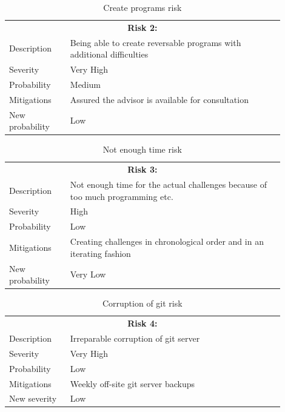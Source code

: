\begin{table}
  \centering
  \begin{tabular}{|p{0.2\linewidth}p{0.7\linewidth}|}
    \hline
    \multicolumn{2}{|c|}{\textbf{Risk 2:}} \\
    Description     & Being able to create reversable programs with additional difficulties           \\
    Severity        & Very High                                 \\
    Probability     & Medium                                   \\
    Mitigations     & Assured the advisor is available for consultation  \\
    New probability & Low       \\
    \hline                            
  \end{tabular}
  \caption{Create programs risk}
\end{table}

\begin{table}
  \centering
  \begin{tabular}{|p{0.2\linewidth}p{0.7\linewidth}|}
    \hline
    \multicolumn{2}{|c|}{\textbf{Risk 3:}} \\
    Description            & Not enough time for the actual challenges because of too much programming etc.           \\
    Severity        & High                                 \\
    Probability     & Low                                   \\
    Mitigations     & Creating challenges in chronological order and in an iterating fashion  \\
    New probability & Very Low     \\
    \hline                              
  \end{tabular}
  \caption{Not enough time risk}
\end{table}

\newpage

\begin{table}
  \centering
  \begin{tabular}{|p{0.2\linewidth}p{0.7\linewidth}|}
    \hline
    \multicolumn{2}{|c|}{\textbf{Risk 4:}} \\
    Description     & Irreparable corruption of git server           \\
    Severity        & Very High                                 \\
    Probability     & Low                                   \\
    Mitigations     & Weekly off-site git server backups  \\
    New severity    & Low      \\
    \hline                             
  \end{tabular}
  \caption{Corruption of git risk}
\end{table}

